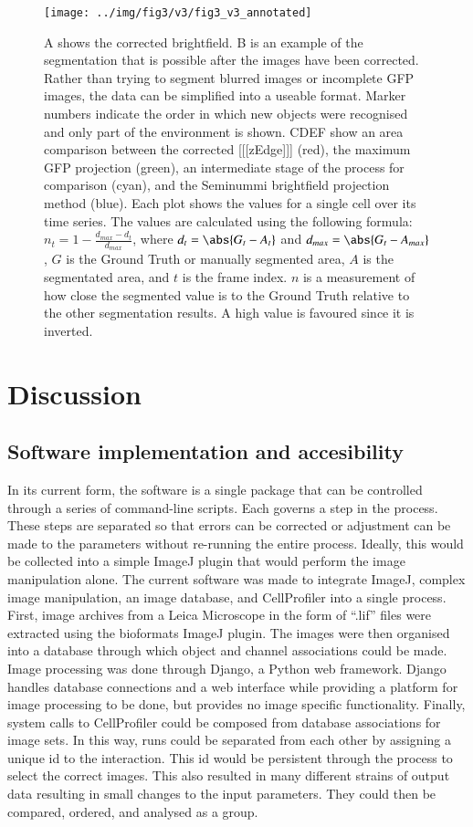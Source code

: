 \documentclass[preprint,11pt,5p,twocolumn]{elsarticle}
\begin{document}
\begin{figure}
\centering\texttt{[image: ../img/fig3/v3/fig3\_v3\_annotated]}
\label{fig:segmentation}
\caption{A shows the corrected brightfield. B is an example of the segmentation that is possible after the images have been corrected. Rather than trying to segment blurred images or incomplete GFP images, the data can be simplified into a useable format. Marker numbers indicate the order in which new objects were recognised and only part of the environment is shown. CDEF show an area comparison between the corrected [[[zEdge]]] (red), the maximum GFP projection (green), an intermediate stage of the process for comparison (cyan), and the Seminummi brightfield projection method (blue). Each plot shows the values for a single cell over its time series. The values are calculated using the following formula: $n_t = 1 - \frac{d_{max} - d_t}{d_{max}}$, where $d_t = \abs{G_t - A_t}$ and $d_{max} = \abs{G_t - A_{max}}$, $G$ is the Ground Truth or manually segmented area, $A$ is the segmentated area, and $t$ is the frame index. $n$ is a measurement of how close the segmented value is to the Ground Truth relative to the other segmentation results. A high value is favoured since it is inverted.}
\end{figure}

\section{Discussion}

\subsection{Software implementation and accesibility}

In its current form, the software is a single package that can be controlled through a series of command-line scripts. Each governs a step in the process. These steps are separated so that errors can be corrected or adjustment can be made to the parameters without re-running the entire process. Ideally, this would be collected into a simple ImageJ plugin that would perform the image manipulation alone. The current software was made to integrate ImageJ, complex image manipulation, an image database, and CellProfiler into a single process. First, image archives from a Leica Microscope in the form of ``.lif'' files were extracted using the bioformats ImageJ plugin. The images were then organised into a database through which object and channel associations could be made. Image processing was done through Django, a Python web framework. Django handles database connections and a web interface while providing a platform for image processing to be done, but provides no image specific functionality. Finally, system calls to CellProfiler could be composed from database associations for image sets. In this way, runs could be separated from each other by assigning a unique id to the interaction. This id would be persistent through the process to select the correct images. This also resulted in many different strains of output data resulting in small changes to the input parameters. They could then be compared, ordered, and analysed as a group.
\end{document}
